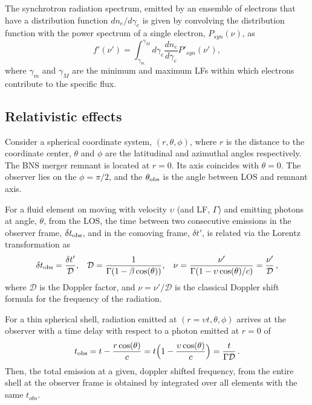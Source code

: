 The synchrotron radiation spectrum, emitted by an ensemble of electrons that have a 
distribution function $dn_e/d\gamma_e$ 
is given by convolving the distribution function with the power spectrum of a single 
electron, $P_{syn}(\nu)$, as 
%
\begin{equation}
f'(\nu') = \int_{\gamma_{m}}^{\gamma_M} d\gamma_e \frac{dn_e}{d\gamma_e}P'_{syn}(\nu'), 
\label{eq:afterglow:sync_power}
\end{equation}
%
where $\gamma_{m}$ and $\gamma_M$ are the minimum and maximum \acp{LF} 
within which electrons contribute to the specific flux.


\subsection{Relativistic effects}

Consider a spherical coordinate system, $(r,\theta,\phi)$, where 
$r$ is the distance to the coordinate center, $\theta$ and $\phi$ 
are the latitudinal and azimuthal angles respectively. 
The \ac{BNS} merger remnant is located at $r=0$. 
Its axis coincides with $\theta = 0$. 
The observer lies on the $\phi = \pi / 2$, and the $\theta_{\rm obs}$ is 
the angle between \ac{LOS} and remnant axis. 

For a fluid element on moving with velocity $\upsilon$ (and \ac{LF}, $\Gamma$) 
and emitting photons at angle, $\theta$, from the \ac{LOS}, the time between 
two consecutive emissions in the observer frame, $\delta t_{\rm obs}$, 
and in the comoving frame, $\delta t'$, is related via the Lorentz transformation as 
%
\begin{equation}
\delta t_{\rm obs} = \frac{\delta t'}{\mathcal{D}}, \hspace{3mm}
\mathcal{D} = \frac{1}{\Gamma(1 - \beta\cos(\theta))}, \hspace{3mm}
\nu = \frac{\nu'}{\Gamma (1 - \upsilon\cos(\theta)/c)} = \frac{\nu'} {\mathcal{D}}\, ,
\label{eq:afterglow:dop_fac}
\end{equation}
%
where $\mathcal{D}$ is the Doppler factor, and $\nu=\nu'/\mathcal{D}$ is the 
classical Doppler shift formula for the frequency of the radiation.


For a thin spherical shell, radiation emitted at $(r=\upsilon t,\theta,\phi)$ 
arrives at the observer with a time delay with respect to a photon emitted at 
$r=0$ of
%
\begin{equation}
t_{\rm obs} = t - \frac{r \cos(\theta)}{c} = t\Big(1-\frac{\upsilon\cos(\theta)}{c}\Big) = \frac{t}{\Gamma\mathcal{D}}\, .
\label{eq:afterglow:tobs}
\end{equation}
%
Then, the total emission at a given, doppler shifted frequency, from the entire 
shell at the observer frame is obtained by integrated over all elements with the 
same $t_{obs}$.

